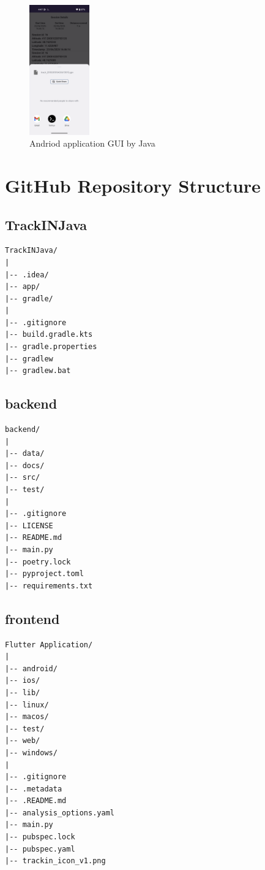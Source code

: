 \documentclass[12pt]{article}
\begin{document}
\begin{figure}[h!]
    \includegraphics[width=0.23\textwidth]{Project_Screenshots/java5.png}
    \caption{Andriod application GUI by Java}
\end{figure}
\clearpage
\section{GitHub Repository Structure}

\subsection*{TrackINJava}
\begin{verbatim}
TrackINJava/
|
|-- .idea/
|-- app/
|-- gradle/
|
|-- .gitignore
|-- build.gradle.kts
|-- gradle.properties
|-- gradlew
|-- gradlew.bat
\end{verbatim}


\subsection*{backend}
\begin{verbatim}
backend/
|
|-- data/
|-- docs/
|-- src/
|-- test/
|
|-- .gitignore
|-- LICENSE
|-- README.md
|-- main.py
|-- poetry.lock
|-- pyproject.toml
|-- requirements.txt
\end{verbatim}

\subsection*{frontend}
\begin{verbatim}
Flutter Application/
|
|-- android/
|-- ios/
|-- lib/
|-- linux/
|-- macos/
|-- test/
|-- web/
|-- windows/
|
|-- .gitignore
|-- .metadata
|-- .README.md
|-- analysis_options.yaml
|-- main.py
|-- pubspec.lock
|-- pubspec.yaml
|-- trackin_icon_v1.png
\end{verbatim}
\end{document}
